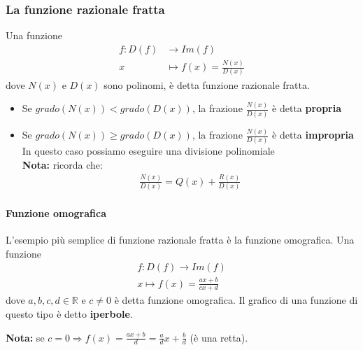 \documentclass[../main.tex]{subfiles}
\begin{document}
\pagebreak
\subsubsection{La funzione razionale fratta}
Una funzione
\begin{align*}
    f: D(f)& \longrightarrow Im(f) \\
    x& \longmapsto f(x) = \frac{N(x)}{D(x)}
\end{align*}
dove $N(x)$ e $D(x)$ sono polinomi, è detta funzione razionale fratta.

\begin{itemize}
    \item Se $grado(N(x)) < grado(D(x))$, la frazione $\frac{N(x)}{D(x)}$ è detta \textbf{propria}
    \item Se $grado(N(x)) \geq  grado(D(x))$, la frazione $\frac{N(x)}{D(x)}$ è detta \textbf{impropria} \\
    In questo caso possiamo eseguire una divisione polinomiale \\
    \textbf{Nota:} ricorda che:
    \begin{align*}
        \frac{N(x)}{D(x)} = Q(x) + \frac{R(x)}{D(x)}
    \end{align*}
\end{itemize}

\paragraph{Funzione omografica}
L'esempio più semplice di funzione razionale fratta è la funzione omografica. Una funzione
\begin{align*}
    f:D(f) \longrightarrow Im(f) \\
    x \longmapsto f(x) = \frac{ax + b}{cx + d}
\end{align*}
dove $a,b,c,d \in \mathbb{R}$ e $c \neq 0$ è detta funzione omografica. Il grafico di una funzione di questo tipo è detto \textbf{iperbole}.

\textbf{Nota:} se $c = 0 \Rightarrow f(x) = \frac{ax+b}{d} = \frac{a}{d}x + \frac{b}{d}$ (è una retta).

\pagebreak
\end{document}
